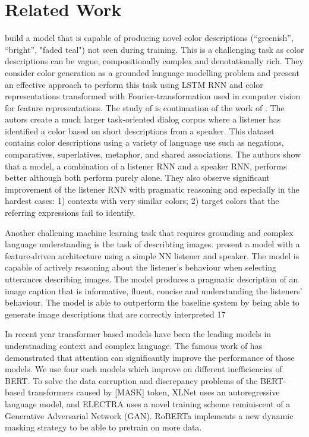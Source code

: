 \section{Related Work}

\citep{monroe-2016-compositional} build a model that is capable of producing novel color descriptions (“greenish”, “bright”, "faded teal") not seen during training. This is a challenging task as color descriptions can be vague, compositionally complex and denotationally rich. They consider color generation as a grounded language modelling problem and present an effective approach to perform this task using LSTM RNN and color representations transformed with Fourier-transformation used in computer vision for feature representations. The study of \citep{monroe-2017-colors} is continuation of the work of \citep{monroe-2016-compositional}. The autors create a much larger task-oriented dialog corpus \citep{moroe-2017-colors-reference-dataset} where a listener has identified a color based on short descriptions from a speaker. This dataset contains color descriptions using a variety of language use such as negations, comparatives, superlatives, metaphor, and shared associations. The authors show that a model, a combination of a listener RNN and a speaker RNN, performs better although both perform purely alone. They also observe significant improvement of the listener RNN with pragmatic reasoning and especially in the hardest cases: 1) contexts with very similar colors; 2) target colors that the referring expressions fail to identify.

\par
Another challening machine learning task that requires grounding and complex language understanding is the task of describting images. \citep{andreas-2016-reasoning} present a model with a feature-driven architecture using a simple NN listener and speaker. The model is capable of actively reasoning about the listener’s behaviour when selecting utterances describing images. The model produces a pragmatic description of an image caption that is informative, fluent, concise and understanding the listeners’ behaviour. The model is able to outperform the baseline system by being able to generate image descriptions that are correctly interpreted 17%

\par
In recent year transformer based models have been the leading models in understnading context and complex language. The famous work of \citep{vaswani-2017-attention} has demonstrated that attention can significantly improve the performance of those models. We use four such models which improve on different inefficiencies of BERT. To solve the data corruption and discrepancy problems of the BERT-based transformers caused by [MASK] token, XLNet \citep{yang-2019-xlnet} uses an autoregressive language model, and ELECTRA \citep{clark-2020-electra} uses a novel training scheme reminiscent of a Generative Adversarial Network (GAN). RoBERTa \citep{liu-2019-roberta} implements a new dynamic masking strategy to be able to pretrain on more data.

